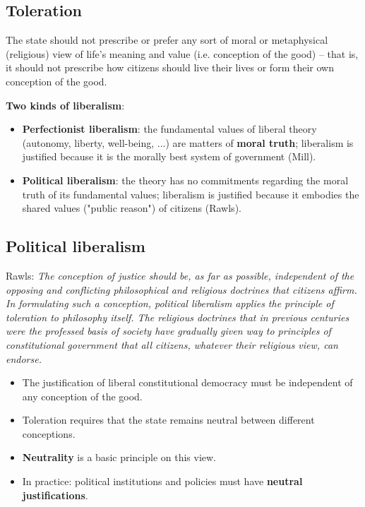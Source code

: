\subsection{Toleration}

The state should not prescribe or prefer any sort of moral or metaphysical
(religious) view of life's meaning and value (i.e. conception of the good) --
that is, it should not prescribe how citizens should live their lives or form
their own conception of the good.

\textbf{Two kinds of liberalism}:
\begin{itemize}
	\item \textbf{Perfectionist liberalism}: the fundamental values of
	 liberal theory (autonomy, liberty, well-being, ...) are matters of
	 \textbf{moral truth}; liberalism is justified because it is the
	 morally best system of government (Mill).
	\item \textbf{Political liberalism}: the theory has no commitments
	 regarding the moral truth of its fundamental values; liberalism is
	 justified because it embodies the shared values ("public reason")
	 of citizens (Rawls).
\end{itemize}

\subsection{Political liberalism}

Rawls:
\textit{The conception of justice should be, as far as possible, independent
of the opposing and conflicting philosophical and religious doctrines that
citizens affirm. In formulating such a conception, political liberalism
applies the principle of toleration to philosophy itself. The religious
doctrines that in previous centuries were the professed basis of society have
gradually given way to principles of constitutional government that all
citizens, whatever their religious view, can endorse.}

\begin{itemize}
	\item The justification of liberal constitutional democracy must be
	 independent of any conception of the good.
	\item Toleration requires that the state remains neutral between
	 different conceptions.
	\item \textbf{Neutrality} is a basic principle on this view.
	\item In practice: political institutions and policies must have
	 \textbf{neutral justifications}.
\end{itemize}


